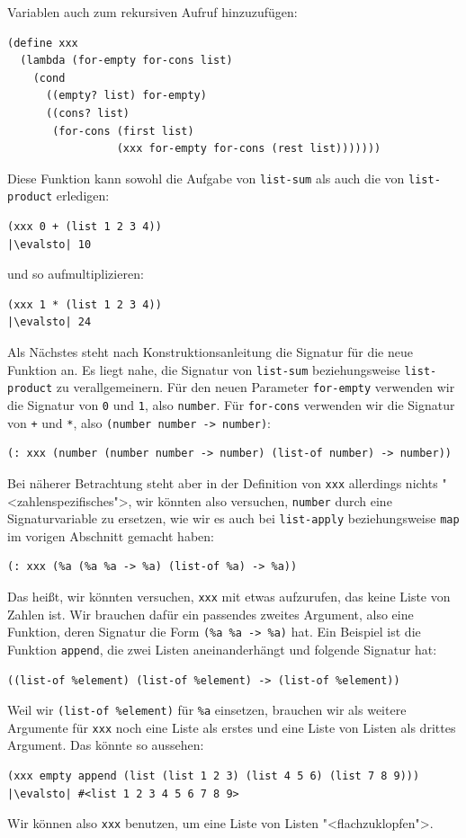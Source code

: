 Variablen auch zum rekursiven Aufruf hinzuzufügen:
%
\begin{lstlisting}
(define xxx
  (lambda (for-empty for-cons list)
    (cond
      ((empty? list) for-empty)
      ((cons? list)
       (for-cons (first list)
                 (xxx for-empty for-cons (rest list)))))))
\end{lstlisting}
%
Diese Funktion kann sowohl die Aufgabe von \lstinline{list-sum} als
auch die von \lstinline{list-product} erledigen:
%
\begin{lstlisting}
(xxx 0 + (list 1 2 3 4))
|\evalsto| 10
\end{lstlisting}
%
und so aufmultiplizieren:
%
\begin{lstlisting}
(xxx 1 * (list 1 2 3 4))
|\evalsto| 24
\end{lstlisting}
%
Als Nächstes steht nach Konstruktionsanleitung die Signatur für die
neue Funktion an.  Es liegt nahe, die Signatur von
\lstinline{list-sum} beziehungsweise \lstinline{list-product} zu
verallgemeinern.  Für den neuen Parameter \lstinline{for-empty}
verwenden wir die Signatur von \lstinline{0} und \lstinline{1}, also
\lstinline{number}.  Für \lstinline{for-cons} verwenden wir die
Signatur von \lstinline{+} und \lstinline{*}, also
\lstinline{(number number -> number)}:
%
\begin{lstlisting}
(: xxx (number (number number -> number) (list-of number) -> number))
\end{lstlisting}
%
Bei näherer Betrachtung steht aber in der Definition von
\lstinline{xxx} allerdings nichts "<zahlenspezifisches">, wir könnten
also versuchen, \lstinline{number} durch eine Signaturvariable zu
ersetzen, wie wir es auch bei \lstinline{list-apply} beziehungsweise \lstinline{map} im vorigen
Abschnitt gemacht haben:
%
\begin{lstlisting}
(: xxx (%a (%a %a -> %a) (list-of %a) -> %a))
\end{lstlisting}
%
Das heißt, wir könnten versuchen, \lstinline{xxx} mit etwas
aufzurufen, das keine Liste von Zahlen ist.  Wir brauchen dafür ein
passendes zweites Argument, also eine
Funktion, deren Signatur die Form \lstinline{(%a %a -> %a)} hat.  Ein
Beispiel ist die Funktion \lstinline{append}, die zwei Listen
aneinanderhängt und folgende Signatur hat:
%
\begin{lstlisting}
((list-of %element) (list-of %element) -> (list-of %element))
\end{lstlisting}
% 
Weil wir \lstinline{(list-of %element)} für \lstinline{%a} einsetzen,
brauchen wir als weitere Argumente für \lstinline{xxx} noch eine
Liste als erstes und eine Liste von Listen als drittes
Argument.  Das könnte so aussehen:
%
\begin{lstlisting}
(xxx empty append (list (list 1 2 3) (list 4 5 6) (list 7 8 9)))
|\evalsto| #<list 1 2 3 4 5 6 7 8 9>
\end{lstlisting}
%
Wir können also \lstinline{xxx} benutzen, um eine Liste von Listen
"<flachzuklopfen">.

